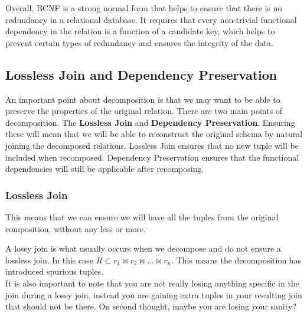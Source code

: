 \documentclass{report}
\begin{document}
Overall, BCNF is a strong normal form that helps to ensure that there is no redundancy in a relational database. It requires that every non-trivial functional dependency in the relation is a function of a candidate key, which helps to prevent certain types of redundancy and ensures the integrity of the data.

\subsection{Lossless Join and Dependency Preservation}

An important point about decomposition is that we may want to be able to preserve the properties of the original relation. There are two main points of decomposition. The \textbf{Lossless Join} and \textbf{Dependency Preservation}. Ensuring these will mean that we will be able to reconstruct the original schema by natural joining the decomposed relations. Lossless Join ensures that no new tuple will be included when recomposed. Dependency Preservation ensures that the functional dependencies will still be applicable after recomposing.


\subsubsection{Lossless Join}

This means that we can ensure we will have all the tuples from the original composition, without any less or more.

\begin{note}
    A lossy join is what usually occurs when we decompose and do not ensure a lossless join. In this case $R \subset r_1 \bowtie r_2 \bowtie \dots \bowtie r_n$. This means the decomposition has introduced spurious tuples. \\

    It is also important to note that you are not really losing anything specific in the join during a lossy join, instead you are gaining extra tuples in your resulting join that should not be there. On second thought, maybe you are losing your sanity? \shrug
\end{note}
\vspace{.5cm}
 
\end{document}
